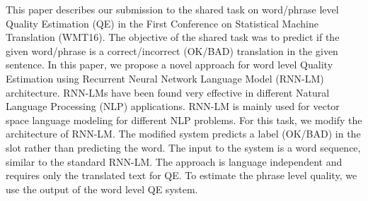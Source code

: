 This paper describes our submission to the shared task on word/phrase level Quality Estimation (QE) in the First Conference on Statistical Machine Translation (WMT16). The objective of the shared task was to predict if the given word/phrase is a correct/incorrect (OK/BAD) translation in the given sentence. In this paper, we propose a novel approach for word level Quality Estimation using Recurrent Neural Network Language Model (RNN-LM) architecture. RNN-LMs have been found very effective in different Natural Language Processing (NLP) applications. RNN-LM is mainly used for vector space language modeling for different NLP problems. For this task, we modify the architecture of RNN-LM. The modified system predicts a label (OK/BAD) in the slot rather than predicting the word. The input to the system is a word sequence, similar to the standard RNN-LM. The approach is language independent and requires only the translated text for QE. To estimate the phrase level quality, we use the output of the word level QE system.
